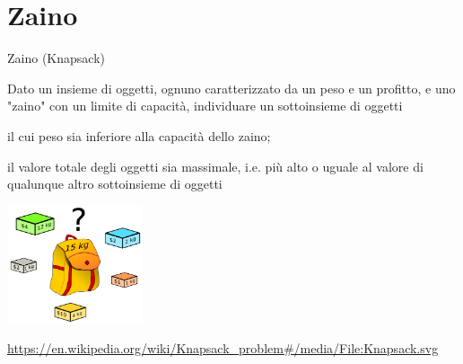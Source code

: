 \section{Zaino}

\begin{frame}{Zaino (Knapsack)}

\vspace{-9pt}
\begin{myboxtitle}
Dato un insieme di oggetti, ognuno caratterizzato da un \alert{peso} e un \alert{profitto},
e uno "zaino" con un limite di capacità, individuare un sottoinsieme di oggetti 
\BIL
\item il cui peso sia inferiore alla capacità dello zaino;\
\item il valore totale degli oggetti sia massimale, i.e.
più alto o uguale al valore di qualunque altro sottoinsieme di oggetti 
\EIL
\end{myboxtitle}

\begin{center}
\includegraphics[width=0.3\textwidth]{knapsack.png}
\end{center}

\footnotesize
\url{https://en.wikipedia.org/wiki/Knapsack_problem\#/media/File:Knapsack.svg}


\end{frame}

